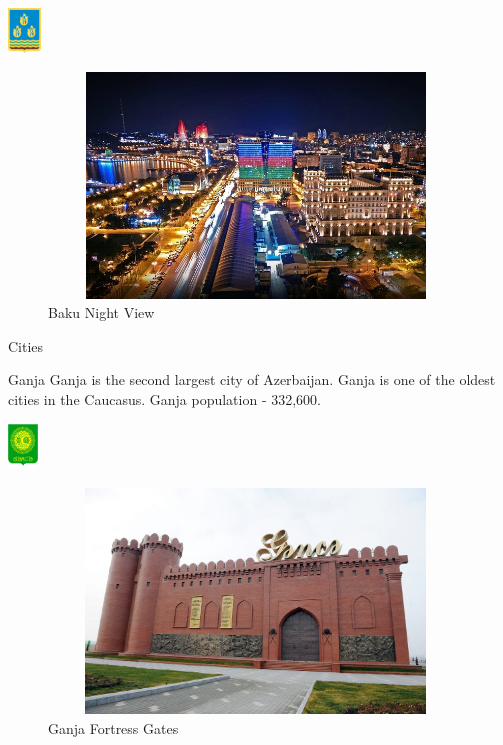 \documentclass[hyperref={pdfpagemode=FullScreen}]{beamer}
\begin{document}
\begin{frame}{\includegraphics[width=.9cm, height=1.2cm]{img/baku04.png}}
    \begin{figure}
        \includegraphics[width=11cm, height=6cm]{img/baku03.jpg}
        \caption{Baku Night View} 
    \end{figure}
\end{frame}

\begin{frame}{Cities}
\begin{alertblock}{Ganja}
\justifying Ganja is the second largest city of Azerbaijan.
Ganja is one of the oldest cities in the Caucasus. Ganja population - 332,600.
\end{alertblock}
\end{frame}

\begin{frame}{\includegraphics[width=.9cm, height=1.2cm]{img/gence04.png}}
    \begin{figure}
        \includegraphics[width=11cm, height=6cm]{img/gence01.jpg}
        \caption{Ganja Fortress Gates} 
    \end{figure}
\end{frame}
\end{document}
